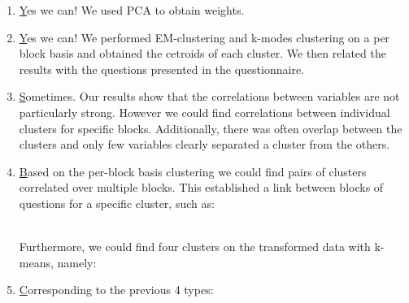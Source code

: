 \documentclass{article}
\begin{document}
\begin{enumerate}
  \item \href{qs:aggregation} Yes we can! We used PCA to obtain weights.

  \item \href{qs:blockCluster} Yes we can! We performed EM-clustering and k-modes clustering on a per block basis and obtained the cetroids of each cluster. We then related the results with the questions presented in the questionnaire.

  \item \href{qs:blockCorrelations} Sometimes. Our results show that the correlations between variables are not particularly strong. However we could find correlations between individual clusters for specific blocks. Additionally, there was often overlap between the clusters and only few variables clearly separated a cluster from the others.

  \item \href{qs:types} Based on the per-block basis clustering we could find pairs of clusters correlated over multiple blocks. This established a link between blocks of questions for a specific cluster, such as:
     \\

    Furthermore, we could find four clusters on the transformed data with k-means, namely:

  \item \href{qs:personal} Corresponding to the previous 4 types:
\end{enumerate}
\end{document}
